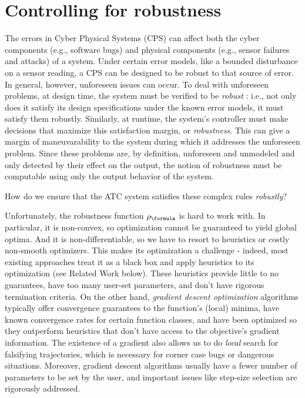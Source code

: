 \section{Controlling for robustness}
\label{sec:intro}
The errors in Cyber Physical Systems (CPS) can affect both the cyber components (e.g., software bugs) and physical components (e.g., sensor failures and attacks) of a system. Under certain error models, like a bounded disturbance on a sensor reading, a CPS can be designed to be robust to that source of error.
In general, however, unforeseen issues can occur. 
To deal with unforeseen problems, at design time, the system must be verified to be \textit{robust} : i.e., not only does it satisfy its design specifications under the known error models, it must satisfy them robustly.
Similarly, at runtime, the system's controller must make decisions that maximize this satisfaction margin, or \textit{robustness}.
This can give a margin of maneuvarability to the system during which it addresses the unforeseen problem.
Since these problems are, by definition, unforeseen and unmodeled and only detected by their effect on the output, the notion of robustness must be computable using only the output behavior of the system.



How do we ensure that the ATC system satisfies these complex rules \textit{robustly}?






Unfortunately, the robustness function $\robf$ is hard to work with.
In particular, it is non-convex, so optimization cannot be guaranteed to yield global optima.
And it is non-differentiable, so we have to resort to heuristics or costly non-smooth optimizers. 
This makes its optimization a challenge - indeed, most existing approaches treat it as a black box and apply heuristics to its optimization (see Related Work below).
These heuristics provide little to no guarantees, have too many user-set parameters, and don't have rigorous termination criteria.
On the other hand, \textit{gradient descent optimization} algorithms typically offer convergence guarantees to the function's (local) minima, have known convergence rates for certain function classes, and have been optimized so they outperform heuristics that don't have access to the objective's gradient information.
The existence of a gradient also allows us to do \textit{local} search for falsifying trajectories, which is necessary for corner case bugs or dangerous situations.
Moreover, gradient descent algorithms usually have a fewer number of parameters to be set by the user, and important issues like step-size selection are rigorously addressed.

